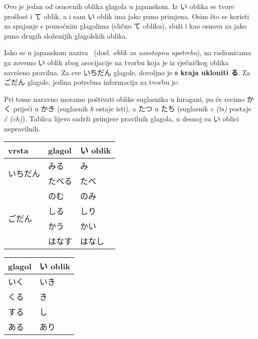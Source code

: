 
\author{Tomislav Mamić}


	
	
	Ovo je jedan od osnovnih oblika glagola u japanskom. Iz い oblika se tvore prošlost i て oblik, a i sam い oblik ima jako puno primjena. Osim što se koristi za spajanje s pomoćnim glagolima (slično て obliku), služi i kao osnova za jako puno drugih složenijih glagolskih oblika.
	
	
	Iako se u japanskom naziva \ (dosl. \textit{oblik za uzastopnu upotrebu}), na radionicama ga zovemo い oblik zbog asocijacije na tvorbu koja je iz rječničkog oblika savršeno pravilna. Za sve いちだん glagole, dovoljno je \textbf{s kraja ukloniti る}. Za ごだん glagole, jedina potrebna informacija za tvorbu je:
	
	
	Pri tome naravno moramo poštivati oblike suglasnika u hiragani, pa će recimo かく prijeći u かき (suglasnik \textit{k} ostaje isti), a たつ u たち (suglasnik \textit{c (ts)} postaje \textit{ć (ch)}). Tablica lijevo sadrži primjere pravilnih glagola, u desnoj su い oblici nepravilnih.
	
	\vspace{10pt}
	\begin{tabular}{|l|l|l|}
		\hline
		\textbf{vrsta}&\textbf{glagol}&\textbf{い oblik}\\
		\hline
		\multirow{2}{50pt}{いちだん}&みる&み\\\cline{2-3}
		&たべる&たべ\\
		\hline
		\multirow{4}{50pt}{ごだん}&のむ&のみ\\\cline{2-3}
		&しる&しり\\\cline{2-3}
		&かう&かい\\\cline{2-3}
		&はなす&はなし\\
		\hline
	\end{tabular}\hspace{10pt}
	\begin{tabular}{|l|l|}
		\hline
		\textbf{glagol}&\textbf{い oblik}\\
		\hline
		いく&いき\\
		\hline
		くる&き\\
		\hline
		する&し\\
		\hline
		ある&あり\\
		\hline
	\end{tabular}
	

